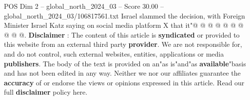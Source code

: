 \begin{textsample}{POS Dim 2 – global\_north\_2024\_03 – Score 30.00 – global\_north\_2024\_03/106817561.txt}
Israel slammed the decision, with Foreign Minister Israel Katz saying on social media platform X that it"@ @ @ @ @ @ @ @ @ @. \textbf{Disclaimer} : The content of this article is \textbf{syndicated} or provided to this website from an external third party \textbf{provider}.
We are not responsible for, and do not control, such external websites, entities, applications or media \textbf{publishers}.
The body of the text is provided on an"as is"and"as \textbf{available}"basis and has not been edited in any way.
Neither we nor our affiliates guarantee the \textbf{accuracy} of or endorse the views or opinions expressed in this article.
Read our full \textbf{disclaimer} policy here.

\end{textsample}
